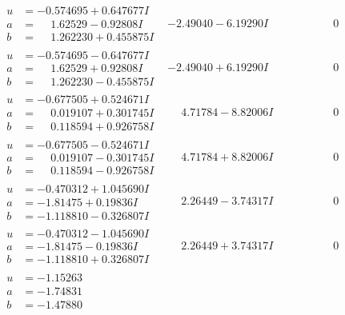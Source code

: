 \documentclass[1p]{elsarticle_modified}
\theoremstyle{definition}
\begin{document}
$$\begin{array}{c|c|c}
\begin{aligned}
u &= -0.574695 + 0.647677 I \\
a &= \phantom{-}1.62529 - 0.92808 I \\
b &= \phantom{-}1.262230 + 0.455875 I\end{aligned}
 & -2.49040 - 6.19290 I & \phantom{-0.000000 } 0 \\ \hline\begin{aligned}
u &= -0.574695 - 0.647677 I \\
a &= \phantom{-}1.62529 + 0.92808 I \\
b &= \phantom{-}1.262230 - 0.455875 I\end{aligned}
 & -2.49040 + 6.19290 I & \phantom{-0.000000 } 0 \\ \hline\begin{aligned}
u &= -0.677505 + 0.524671 I \\
a &= \phantom{-}0.019107 + 0.301745 I \\
b &= \phantom{-}0.118594 + 0.926758 I\end{aligned}
 & \phantom{-}4.71784 - 8.82006 I & \phantom{-0.000000 } 0 \\ \hline\begin{aligned}
u &= -0.677505 - 0.524671 I \\
a &= \phantom{-}0.019107 - 0.301745 I \\
b &= \phantom{-}0.118594 - 0.926758 I\end{aligned}
 & \phantom{-}4.71784 + 8.82006 I & \phantom{-0.000000 } 0 \\ \hline\begin{aligned}
u &= -0.470312 + 1.045690 I \\
a &= -1.81475 + 0.19836 I \\
b &= -1.118810 - 0.326807 I\end{aligned}
 & \phantom{-}2.26449 - 3.74317 I & \phantom{-0.000000 } 0 \\ \hline\begin{aligned}
u &= -0.470312 - 1.045690 I \\
a &= -1.81475 - 0.19836 I \\
b &= -1.118810 + 0.326807 I\end{aligned}
 & \phantom{-}2.26449 + 3.74317 I & \phantom{-0.000000 } 0 \\ \hline\begin{aligned}
u &= -1.15263\phantom{ +0.000000I} \\
a &= -1.74831\phantom{ +0.000000I} \\
b &= -1.47880\phantom{ +0.000000I}\end{aligned}

\end{array}$$
\end{document}
